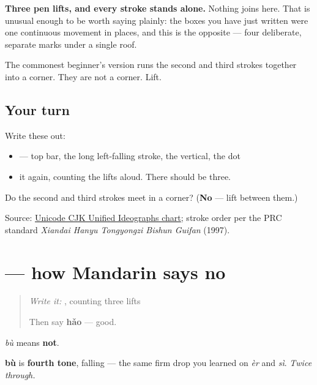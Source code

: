 \textbf{Three pen lifts, and every stroke stands alone.} Nothing joins here. That is unusual enough to be worth saying plainly: the boxes you have just written were one continuous movement in places, and this is the opposite — four deliberate, separate marks under a single roof.

The commonest beginner's version runs the second and third strokes together into a corner. They are not a corner. Lift.

\subsection*{Your turn}
Write these out:

\begin{itemize}
\raggedright
  \item {} — top bar, the long left-falling stroke, the vertical, the dot
  \item it again, counting the lifts aloud. There should be three.
\end{itemize}

\begin{tcolorbox}[breakable,colback=teal!4,colframe=teal!35!black,title={Before you move on}]
Do the second and third strokes meet in a corner? (\textbf{No} — lift between them.)

Source: \href{https://www.unicode.org/charts/PDF/U4E00.pdf}{Unicode CJK Unified Ideographs chart}; stroke order per the PRC standard \emph{Xiandai Hanyu Tongyongzi Bishun Guifan} (1997).
\end{tcolorbox}
\section[\texorpdfstring{\zh{不} (bù)}{不 (bù)}]{ — how Mandarin says no}

\label{lesson:ZH-C04-bu}



\begin{quote}
\emph{Write it:} , counting three lifts

Then say \textbf{hǎo} — good.
\end{quote}

\begin{sounds}
\textbf{} \emph{bù} means \textbf{not}.

\textbf{bù} is \textbf{fourth tone}, falling — the same firm drop you learned on \emph{èr} and \emph{sì}. \emph{Twice through.}
\end{sounds}

